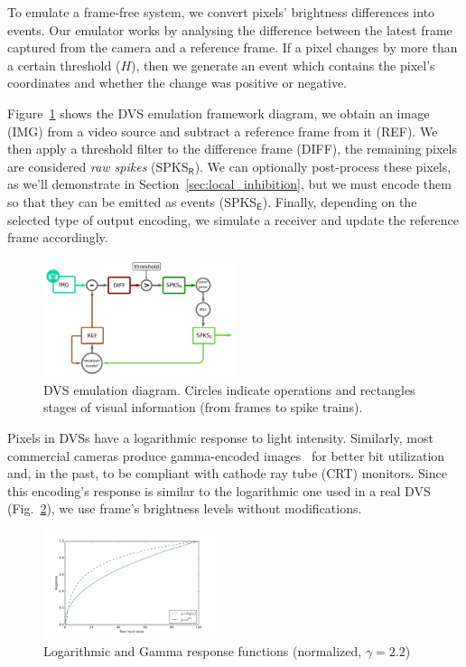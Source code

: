 \documentclass[conference]{IEEEtran}
\begin{document}
To emulate a frame-free system, we convert pixels' brightness differences into events. Our emulator works by analysing the difference between the latest frame captured from the camera and a reference frame. If a pixel changes by more than a certain threshold ($H$), then we generate an event which contains the pixel's coordinates and whether the change was positive or negative. 

Figure~\ref{fig:dvs_emu} shows the DVS emulation framework diagram, we obtain an image (\textsf{IMG}) from a video source and subtract a reference frame from it  (\textsf{REF}). We then apply a threshold filter to the difference frame (\textsf{DIFF}), the remaining pixels are considered \textit{raw spikes} (\textsf{SPKS}$\mathsf{_R}$). We can optionally post-process these pixels, as we'll demonstrate in Section~\ref{sec:local_inhibition}, but we must encode them so that they can be emitted as events (\textsf{SPKS}$\mathsf{_E}$). Finally, depending on the selected type of output encoding, we simulate a receiver and update the reference frame accordingly. 

\begin{figure}[htb]
  \centering
  \includegraphics[width=0.5\textwidth]{dvs_emu}
  \caption{DVS emulation diagram. Circles indicate operations and rectangles stages of visual information (from frames to spike trains).}
  \label{fig:dvs_emu}
\end{figure}

Pixels in DVSs have a logarithmic response to light intensity. Similarly, most commercial cameras produce gamma-encoded images~\cite{PoyntonDigitalVideo} for better bit utilization and, in the past, to be compliant with cathode ray tube (CRT) monitors. Since this encoding's response is similar to the logarithmic one used in a real DVS (Fig.~\ref{fig:gamma_coding}), we use frame's brightness levels without modifications.
\begin{figure}[htb]
  \centering
  \includegraphics[width=0.45\textwidth]{log_vs_gamma_response}
  \caption{Logarithmic and Gamma response functions (normalized, $\gamma = 2.2$)}
  \label{fig:gamma_coding}
\end{figure}
\end{document}
